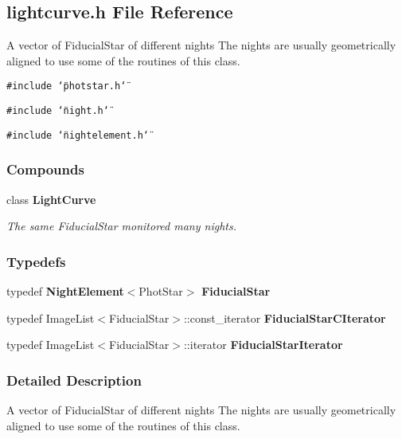 \subsection{lightcurve.h File Reference}
\label{lightcurve_h}
A vector of Fiducial\-Star of different nights The nights are usually geometrically aligned to use some of the routines of this class. 


{\tt \#include \char`\"{}photstar.h\char`\"{}}\par
{\tt \#include \char`\"{}night.h\char`\"{}}\par
{\tt \#include \char`\"{}nightelement.h\char`\"{}}\par
\subsubsection*{Compounds}
\begin{CompactItemize}
\item 
class {\bf Light\-Curve}
\begin{CompactList}\small\item\em The same Fiducial\-Star monitored many nights.\item\end{CompactList}\end{CompactItemize}
\subsubsection*{Typedefs}
\begin{CompactItemize}
\item 
{}
typedef {\bf Night\-Element}$<$Phot\-Star$>$ {\bf Fiducial\-Star}\label{lightcurve_h_a0}

\item 
{}
typedef Image\-List$<$Fiducial\-Star$>$::const\_\-iterator {\bf Fiducial\-Star\-CIterator}\label{lightcurve_h_a1}

\item 
{}
typedef Image\-List$<$Fiducial\-Star$>$::iterator {\bf Fiducial\-Star\-Iterator}\label{lightcurve_h_a2}

\end{CompactItemize}


\subsubsection{Detailed Description}
A vector of Fiducial\-Star of different nights The nights are usually geometrically aligned to use some of the routines of this class.




